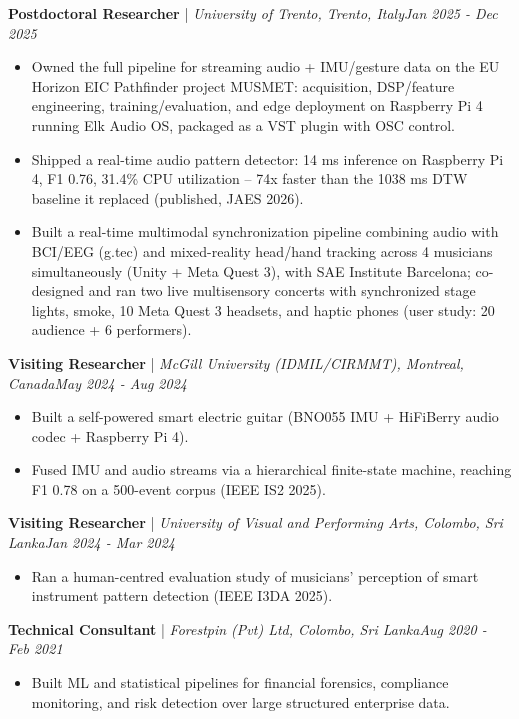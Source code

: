\documentclass[11pt]{article}
\newenvironment{cvrole}[5]{%
  \par\noindent\textbf{\large #1} | \textit{\small #2, #3}\hfill \textit{\small #4 - #5}\par
  \begin{itemize}[leftmargin=2em, itemsep=-0.3em, topsep=-0.5em]%
}{%
  \end{itemize}\par\noindent\mbox{}\par\vspace{0.1em}%
}
\begin{document}
\begin{cvrole}{Postdoctoral Researcher}{University of Trento}{Trento, Italy}{Jan 2025}{Dec 2025}
\item Owned the full pipeline for streaming audio + IMU/gesture data on the EU Horizon EIC Pathfinder project MUSMET: acquisition, DSP/feature engineering, training/evaluation, and edge deployment on Raspberry Pi 4 running Elk Audio OS, packaged as a VST plugin with OSC control.
\item Shipped a real-time audio pattern detector: 14 ms inference on Raspberry Pi 4, F1 0.76, 31.4\% CPU utilization -- 74x faster than the 1038 ms DTW baseline it replaced (published, JAES 2026).
\item Built a real-time multimodal synchronization pipeline combining audio with BCI/EEG (g.tec) and mixed-reality head/hand tracking across 4 musicians simultaneously (Unity + Meta Quest 3), with SAE Institute Barcelona; co-designed and ran two live multisensory concerts with synchronized stage lights, smoke, 10 Meta Quest 3 headsets, and haptic phones (user study: 20 audience + 6 performers).
\end{cvrole}

\begin{cvrole}{Visiting Researcher}{McGill University (IDMIL/CIRMMT)}{Montreal, Canada}{May 2024}{Aug 2024}
\item Built a self-powered smart electric guitar (BNO055 IMU + HiFiBerry audio codec + Raspberry Pi 4).
\item Fused IMU and audio streams via a hierarchical finite-state machine, reaching F1 0.78 on a 500-event corpus (IEEE IS2 2025).
\end{cvrole}

\begin{cvrole}{Visiting Researcher}{University of Visual and Performing Arts}{Colombo, Sri Lanka}{Jan 2024}{Mar 2024}
\item Ran a human-centred evaluation study of musicians' perception of smart instrument pattern detection (IEEE I3DA 2025).
\end{cvrole}

\begin{cvrole}{Technical Consultant}{Forestpin (Pvt) Ltd}{Colombo, Sri Lanka}{Aug 2020}{Feb 2021}
\item Built ML and statistical pipelines for financial forensics, compliance monitoring, and risk detection over large structured enterprise data.
\end{cvrole}
\end{document}
